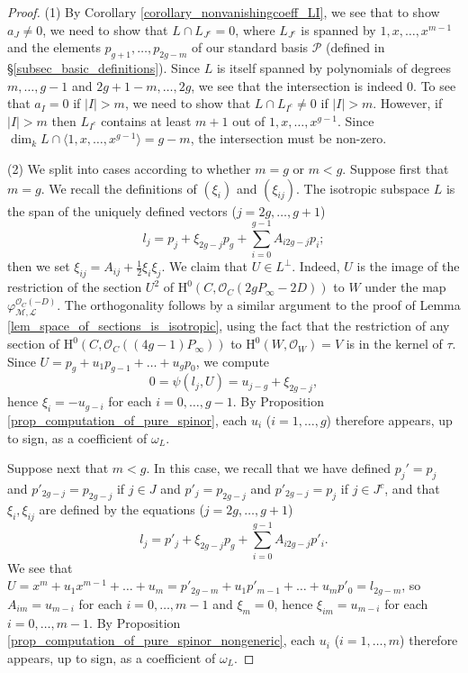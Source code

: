 \documentclass{article} %
\numberwithin{equation}{section}
\newcommand{\sh}[1]{\mathscr{#1}}
\newcommand{\HH}{\mathrm{H}}
\newcommand{\cO}{\mathcal{O}}
\begin{document}
\begin{proof}
    (1) By Corollary \ref{corollary_nonvanishingcoeff_LI}, we see that to show $a_J \neq 0$, we need to show that $L \cap L_{J^c} = 0$, where $L_{J^c}$ is spanned by $1, x, \dots, x^{m-1}$ and  the elements $p_{g+1}, \dots, p_{2g-m}$ of our standard basis $\mathcal{P}$ (defined in \S \ref{subsec_basic_definitions}). Since $L$ is itself spanned by polynomials of degrees $m, \dots, g-1$ and $2g+1-m, \dots, 2g$, we see that the intersection is indeed 0. To see that $a_I = 0$ if $|I| > m$, we need to show that $L \cap L_{I^c} \neq 0$ if $|I| > m$. However, if $|I| > m$ then $L_{I^c}$ contains at least $m+1$ out of $1, x, \dots, x^{g-1}$. Since $\dim_k  L \cap \langle 1, x, \dots, x^{g-1} \rangle = g - m$, the intersection must be non-zero.

    (2) We split into cases according to whether $m = g$ or $m < g$. Suppose first that $m = g$. We recall the definitions of $(\xi_i)$ and $(\xi_{ij})$. The isotropic subspace  $L$ is the span of the uniquely defined vectors ($j = 2g, \dots, g+1$)
    \[ l_j = p_j + \xi_{2g-j}{p_g} + \sum_{i=0}^{g-1} A_{i 2g-j} p_i; \]
    then we set $\xi_{ij} = A_{ij} + \frac{1}{2} \xi_i \xi_j$. We claim that $U \in L^\perp$. Indeed, $U$ is the image of the restriction of the section $U^2$ of $\HH^0(C, \cO_C(2g P_\infty - 2D))$ to $W$ under the map $\varphi_{\sh{M}, \sh{L}}^{\cO_C(-D)}$. The orthogonality follows by a similar argument to the proof of Lemma \ref{lem_space_of_sections_is_isotropic}, using the fact that the restriction of any section of $\HH^0(C, \cO_C((4g-1)P_\infty))$ to $\HH^0(W, \cO_W) = V$ is in the kernel of $\tau$. Since $U = p_g + u_1 p_{g-1} + \dots + u_g p_0$, we compute
    \[ 0 = \psi(l_j, U) = u_{j-g} + \xi_{2g-j}, \]
    hence $\xi_i = -u_{g-i}$ for each $i = 0, \dots, g-1$. By Proposition \ref{prop_computation_of_pure_spinor}, each $u_i$ ($i = 1, \dots, g$) therefore appears, up to sign, as a coefficient of $\omega_L$. 

    Suppose next that $m < g$. In this case, we recall that we have defined $p_j' = p_j$ and $p'_{2g-j} = p_{2g-j}$ if $j \in J$ and $p'_j = p_{2g-j}$ and $p'_{2g-j} = p_j $ if $j \in J^c$, and that $\xi_i, \xi_{ij}$ are defined by the equations ($j = 2g, \dots, g+1$)
    \begin{equation}\label{eqn_rappels_l_j} l_j = p'_j + \xi_{2g-j}{p_g} + \sum_{i=0}^{g-1} A_{i 2g-j} p'_i. 
    \end{equation}
    We see that $U = x^m + u_1 x^{m-1} + \dots + u_m = p'_{2g-m} + u_1 p'_{m-1} + \dots + u_m p'_0 = l_{2g-m}$, so $A_{i m} = u_{m-i}$ for each $i = 0, \dots, m-1$ and $\xi_m = 0$, hence $\xi_{im} = u_{m-i}$ for each $i = 0, \dots, m-1$. By Proposition \ref{prop_computation_of_pure_spinor_nongeneric}, each $u_i$ ($i = 1, \dots, m$) therefore appears, up to sign, as a coefficient of $\omega_L$. 


\end{proof}
\end{document}
